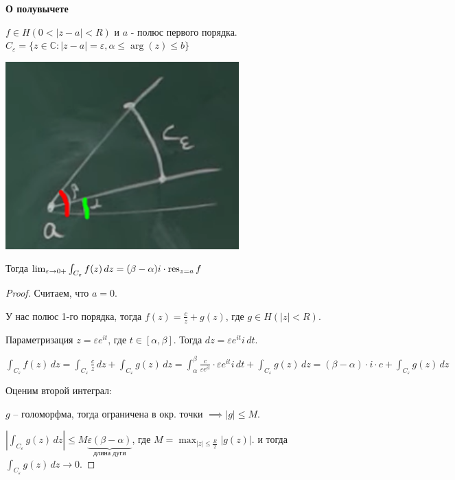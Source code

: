 \begin{lemma}
    \textbf{О полувычете}

    $f \in H(0 < |z - a| < R)$ и $a$ - полюс первого порядка. $C_{\varepsilon} = \{ z \in \mathbb{C} : |z - a| = \varepsilon, \alpha \leqslant \arg (z) \leqslant b \}$

    \begin{center}
        \includegraphics[width=9cm]{assets/04-functions-of-complex-variables/lemma-about-half-deduction.png}
    \end{center}

    Тогда $\lim_{\varepsilon \to 0+} \int_{C_{\varepsilon}} f(z) \, dz = (\beta - \alpha) i \cdot \operatorname{res}_{z = a} f$
\end{lemma}

\begin{proof}
    Считаем, что $a = 0$.

    У нас полюс 1-го порядка, тогда $f(z) = \frac{c}{z} + g(z)$, где $g \in H(|z| < R)$.

    Параметризация $z = \varepsilon e^{it}$, где $t \in [\alpha, \beta]$. Тогда $dz = \varepsilon e^{it} i \, dt$.

    $\int_{C_{\varepsilon}} f(z) \, dz = \int_{C_{\varepsilon}} \frac{c}{z} \, dz + \int_{C_{\varepsilon}} g(z) \, dz =
    \int_{\alpha}^{\beta} \frac{c}{\varepsilon e^{it}} \cdot \varepsilon e^{it} i \, dt + \int_{C_{\varepsilon}} g(z) \, dz = (\beta - \alpha) \cdot i \cdot c + \int_{C_{\varepsilon}} g(z) \, dz$

    Оценим второй интеграл:

    $g$ -- голоморфма, тогда ограничена в окр. точки $\implies |g| \leq M$.

    $\left|\int_{C_{\varepsilon}} g(z) \, dz\right| \leqslant M \underbrace{\varepsilon (\beta - \alpha)}_{\text{длина дуги}}$, где $M = \max_{|z| \leqslant \frac{R}{2}} |g(z)|$. и
    тогда $\int_{C_{\varepsilon}} g(z) \, dz \rightarrow 0$.
\end{proof}

